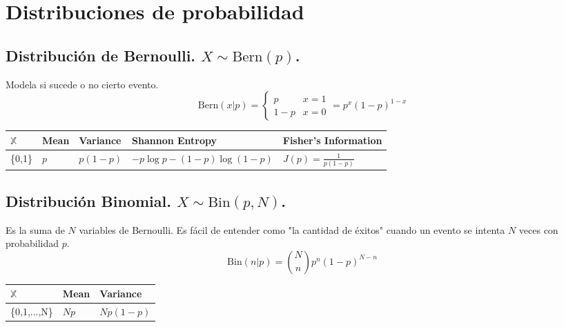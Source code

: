 \chapter{Distribuciones de probabilidad}
\section{Distribuci\'on de Bernoulli. $X\sim \text{Bern}(p)$.}
Modela si sucede o no cierto evento.
\begin{equation}
    \text{Bern}(x|p) = \left\{
    \begin{array}{lr}
        p & x=1 \\
        1-p & x=0
    \end{array}
    \right.
    =
    p^x(1-p)^{1-x}
\end{equation}
\begin{table}[h]
\centering
\begin{tabular}{|l|l|l|l|l|} 
\hline
$\mathbb{X}$& Mean & Variance & Shannon Entropy & Fisher's Information  \\ 
\hline
\{0,1\}    &   $p$      &  $p(1-p)$  & $-p\log p -(1-p)\log(1-p) $  & $J(p)= \frac{1}{p(1-p)}$                  \\
\hline
\end{tabular}
\end{table}




\section{Distribuci\'on Binomial. $X\sim \text{Bin}(p,N)$.}
Es la suma de $N$ variables de Bernoulli. Es fácil de entender como "la cantidad de éxitos" cuando un evento se intenta $N$ veces con probabilidad $p$.
\begin{equation}
    \text{Bin}(n|p) = \binom{N}{n}p^n(1-p)^{N-n}
\end{equation}
\begin{table}[h]
\centering
\begin{tabular}{|l|l|l|} 
\hline
$\mathbb{X}$& Mean & Variance \\ 
\hline
\{0,1,...,N\}    &   $Np$      &  $Np(1-p)$ \\
\hline
\end{tabular}
\end{table}

